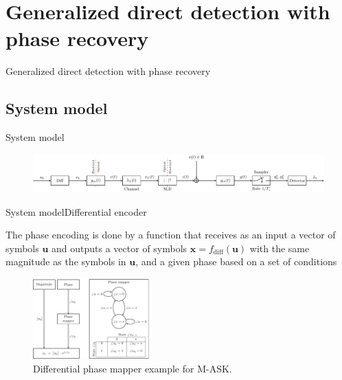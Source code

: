 \documentclass[en]{sdqbeamer}
\begin{document}
\section[Generalized direct detection]{Generalized direct detection with phase recovery}

\begin{frame}{}{}
\center\Huge Generalized direct detection with phase recovery
\end{frame}


\subsection{System model}

\begin{frame}{System model}{}
\begin{figure}
\begin{center}
\includegraphics[width=\textwidth]{Plabst_system_model.pdf}
\end{center}
\end{figure}
\end{frame}


\begin{frame}{System model}{Differential encoder}

The phase encoding is done by a function that receives as an input a vector of symbols $\bm u$ and outputs a vector of symbols $\bm x=f_\text{diff}(\bm u)$ with the same magnitude as the symbols in $\bm u$, and a given phase based on a set of conditions

\begin{figure}[htbp]
\begin{center}
\includegraphics[width=0.4\textwidth]{diff_map_M_ASK.pdf}
\caption{Differential phase mapper example for M-ASK.}
\label{fig:diff_encoding}
\end{center}
\end{figure}


\end{frame}
\end{document}
